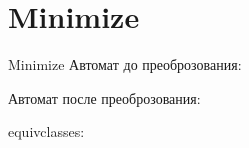\section{Minimize}
\begin{frame}{Minimize}
	Автомат до преоброзования:


	Автомат после преоброзования:


	equivclasses:


\end{frame}

